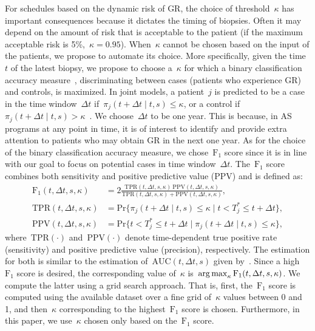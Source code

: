For schedules based on the dynamic risk of GR, the choice of threshold~$\kappa$ has important consequences because it dictates the timing of biopsies. Often it may depend on the amount of risk that is acceptable to the patient (if the maximum acceptable risk is 5\%,~$\kappa = 0.95$). When~$\kappa$ cannot be chosen based on the input of the patients, we propose to automate its choice. More specifically, given the time~$t$ of the latest biopsy, we propose to choose a~$\kappa$ for which a binary classification accuracy measure~\citep{lopez2014optimalcutpoints}, discriminating between cases (patients who experience GR) and controls, is maximized. In joint models, a patient~$j$ is predicted to be a case in the time window~$\Delta t$ if~$\pi_j(t + \Delta t \mid t,s) \leq \kappa$, or a control if~$\pi_j(t + \Delta t \mid t,s) > \kappa$~\citep*{rizopoulosJMbayes, landmarking2017}. We choose~$\Delta t$ to be one year. This is because, in AS programs at any point in time, it is of interest to identify and provide extra attention to patients who may obtain GR in the next one year. As for the choice of the binary classification accuracy measure, we chose~$\mbox{F}_1$ score since it is in line with our goal to focus on potential cases in time window~$\Delta t$. The~$\mbox{F}_1$ score combines both sensitivity and positive predictive value (PPV) and is defined as:
\begin{align*}
\mbox{F}_1(t, \Delta t, s, \kappa) &= 2\frac{\mbox{TPR}(t, \Delta t, s, \kappa)\ \mbox{PPV}(t, \Delta t, s, \kappa)}{\mbox{TPR}(t, \Delta t, s, \kappa) + \mbox{PPV}(t, \Delta t, s, \kappa)},\\
\mbox{TPR}(t, \Delta t, s, \kappa) &= \mbox{Pr}\big\{\pi_j(t + \Delta t \mid t,s) \leq \kappa \mid t < T^*_j \leq t + \Delta t\big\},\\
\mbox{PPV}(t, \Delta t, s, \kappa) &= \mbox{Pr}\big\{t < T^*_j \leq t + \Delta t \mid \pi_j(t + \Delta t \mid t,s) \leq \kappa \big\},
\end{align*}
where~$\mbox{TPR}(\cdot)$ and~$\mbox{PPV}(\cdot)$ denote time-dependent true positive rate (sensitivity) and positive predictive value (precision), respectively. The estimation for both is similar to the estimation of~$\mbox{AUC}(t, \Delta t, s)$ given by~\citet{landmarking2017}. Since a high~$\mbox{F}_1$ score is desired, the corresponding value of~$\kappa$ is~$\operatorname{arg\,max}_{\kappa} \mbox{F}_1(t, \Delta t, s, \kappa)$. We compute the latter using a grid search approach. That is, first, the~$\mbox{F}_1$ score is computed using the available dataset over a fine grid of~$\kappa$ values between 0 and 1, and then~$\kappa$ corresponding to the highest~$\mbox{F}_1$ score is chosen. Furthermore, in this paper, we use~$\kappa$ chosen only based on the~$\mbox{F}_1$ score.

